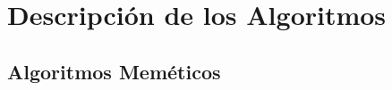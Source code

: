 \chapter{Descripción de los Algoritmos}\label{ch:descripcion_algoritmos}

\section{Algoritmos Meméticos}\label{sec:algoritmos_memeticos}
